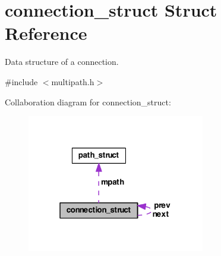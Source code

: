 \hypertarget{structconnection__struct}{\section{connection\-\_\-struct Struct Reference}
\label{structconnection__struct}
}


Data structure of a connection.  




{\ttfamily \#include $<$multipath.\-h$>$}



Collaboration diagram for connection\-\_\-struct\-:\nopagebreak
\begin{figure}[H]
\begin{center}
\leavevmode
\includegraphics[width=220pt]{structconnection__struct__coll__graph}
\end{center}
\end{figure}
